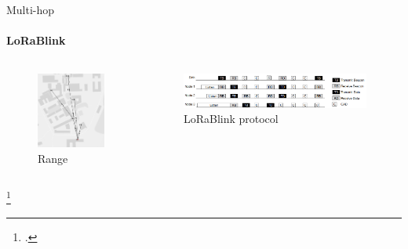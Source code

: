 \begin{frame}{Multi-hop}
\framesubtitle{LoRaBlink}
\begin{columns}
\begin{column}{0.3\textwidth}
\begin{figure}[H]
    \centering
    \includegraphics[width=1\textwidth]{presentation.tex/fig/lorablink2.png}
    \caption{Range\footnotemark}
\end{figure}
\end{column}
\begin{column}{0.7\textwidth}
\begin{figure}[H]
    \centering
    \includegraphics[width=0.98\textwidth]{presentation.tex/fig/lorablink.png}
    \caption{LoRaBlink protocol\footnotemark}
\end{figure}
\end{column}
\end{columns}
\footcitetext{lorablink}
\end{frame}


